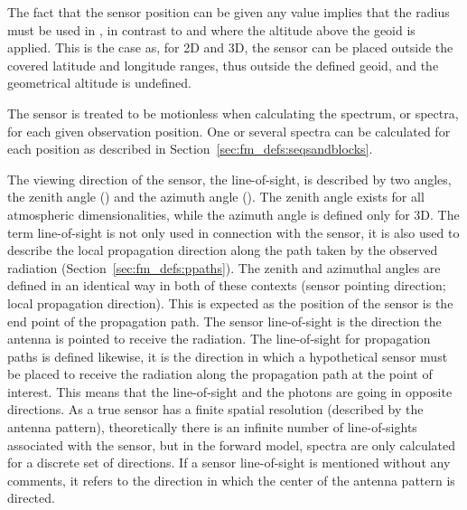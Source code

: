 The fact that the sensor position can be given any value implies that
the radius must be used in , in contrast to
 and  where the altitude
above the geoid is applied. This is the case as, for 2D and 3D, the
sensor can be placed outside the covered latitude and longitude
ranges, thus outside the defined geoid, and the geometrical altitude is
undefined. 

The sensor is treated to be motionless when calculating the spectrum,
or spectra, for each given observation position. One or several
spectra can be calculated for each position as described in
Section~\ref{sec:fm_defs:seqsandblocks}.


\label{sec:fm_defs:los}

The viewing direction of the sensor, the line-of-sight, is described
by two angles, the zenith angle (\ZntAng) and the azimuth angle
(\AzmAng). The zenith angle exists for all atmospheric
dimensionalities, while the azimuth angle is defined only for 3D.
The term line-of-sight is not only used in connection with the sensor,
it is also used to describe the local propagation direction along the
path taken by the observed radiation
(Section~\ref{sec:fm_defs:ppaths}).  The zenith and azimuthal angles
are defined in an identical way in both of these contexts (sensor
pointing direction; local propagation direction). This is expected as
the position of the sensor is the end point of the propagation path.
The sensor line-of-sight is the direction the antenna is pointed to
receive the radiation. The line-of-sight for propagation paths is
defined likewise, it is the direction in which a hypothetical sensor
must be placed to receive the radiation along the propagation path at
the point of interest. This means that the line-of-sight and the
photons are going in opposite directions. As a true sensor has a
finite spatial resolution (described by the antenna pattern),
theoretically there is an infinite number of line-of-sights associated
with the sensor, but in the forward model, spectra are only calculated
for a discrete set of directions. If a sensor line-of-sight is
mentioned without any comments, it refers to the direction in which
the center of the antenna pattern is directed.

